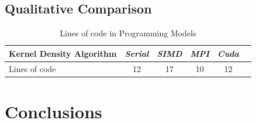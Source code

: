 \documentclass[review]{elsarticle}
\begin{document}
\subsection{Qualitative Comparison}

\begin{table}[h]
  \centering
\begin{tabular}{l *5c @{}}    \toprule
  Kernel Density Algorithm & \emph{Serial} & \emph{SIMD}  & \emph{MPI}  & \emph{Cuda}  \\\midrule
\rowcolor{blue!35} Lines of code & 12 & 17 & 10 & 12  \\ \bottomrule
 \hline
\end{tabular}
\caption{Lines of code in Programming Models}
\label{tab:sim_attr}
\end{table}


\section{Conclusions}


\nocite{*}

\end{document}
